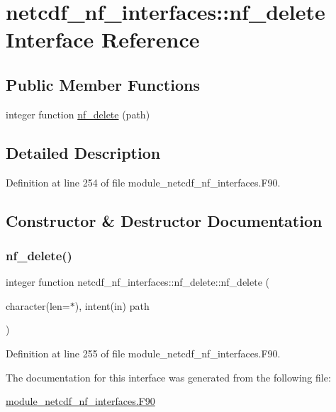 \hypertarget{interfacenetcdf__nf__interfaces_1_1nf__delete}{}\section{netcdf\+\_\+nf\+\_\+interfaces\+:\+:nf\+\_\+delete Interface Reference}
\label{interfacenetcdf__nf__interfaces_1_1nf__delete}
\subsection*{Public Member Functions}
\begin{DoxyCompactItemize}
\item 
integer function \hyperlink{interfacenetcdf__nf__interfaces_1_1nf__delete_a494361fdf1ab722322ee222666314ae4}{nf\+\_\+delete} (path)
\end{DoxyCompactItemize}


\subsection{Detailed Description}


Definition at line 254 of file module\+\_\+netcdf\+\_\+nf\+\_\+interfaces.\+F90.



\subsection{Constructor \& Destructor Documentation}
\mbox{\label{interfacenetcdf__nf__interfaces_1_1nf__delete_a494361fdf1ab722322ee222666314ae4}} 
\subsubsection{\texorpdfstring{nf\+\_\+delete()}{nf\_delete()}}
{\footnotesize\ttfamily integer function netcdf\+\_\+nf\+\_\+interfaces\+::nf\+\_\+delete\+::nf\+\_\+delete (\begin{DoxyParamCaption}\item[{character(len=$\ast$), intent(in)}]{path }\end{DoxyParamCaption})}



Definition at line 255 of file module\+\_\+netcdf\+\_\+nf\+\_\+interfaces.\+F90.



The documentation for this interface was generated from the following file\+:\begin{DoxyCompactItemize}
\item 
\hyperlink{module__netcdf__nf__interfaces_8F90}{module\+\_\+netcdf\+\_\+nf\+\_\+interfaces.\+F90}\end{DoxyCompactItemize}
